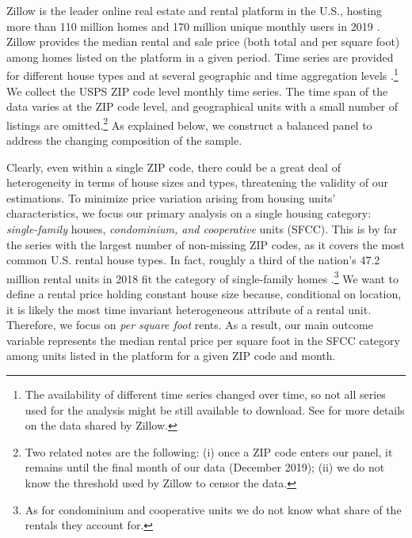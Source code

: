Zillow is the leader online real estate and rental platform in the U.S., hosting more 
than 110 million homes and 170 million unique monthly users in 2019 
\parencite{ZillowFacts}. Zillow provides the median rental and sale price (both 
total and per square foot) among homes listed on the platform in a given period. Time 
series are provided for different house types and at several geographic and time 
aggregation levels \parencite{ZillowData}.\footnote{The availability of different time 
	series changed over time, so not all series used for the analysis might be still 
	available to download. See \textcite{ZillowData} for more details on the data shared 
	by Zillow.} 
We collect the USPS ZIP code level monthly time series. The time span of the data 
varies at the ZIP code level, and geographical units with a small number of listings
are omitted.\footnote{Two related notes are the following: (i) once a ZIP code enters 
	our panel, it remains until the final month of our data (December 2019); (ii) we do not 
	know the threshold used by Zillow to censor the data.} 
As explained below, we construct a balanced panel to address the changing composition 
of the sample.

Clearly, even within a single ZIP code, there could be a great deal of heterogeneity in 
terms of house sizes and types, threatening the validity of our estimations.
To minimize price variation arising from housing units' characteristics, we focus 
our primary analysis on a single housing category: \textit{single-family} houses, 
\textit{condominium, and cooperative} units (SFCC). This is by far the series with the 
largest number of non-missing ZIP codes, as it covers the most common U.S. rental house 
types. In fact, roughly a third of the nation's 47.2 million rental units in 2018 fit the 
category of single-family homes \parencite{fernald2020americas}.\footnote{As for condominium 
	and cooperative units we do not know what share of the rentals they account for.} 
We want to define a rental price holding constant house size because, conditional on location,
it is likely the most time invariant heterogeneous attribute of a rental unit. Therefore, 
we focus on \textit{per square foot} rents. As a result, our main 
outcome variable represents the median rental price per square foot in the SFCC category 
among units listed in the platform for a given ZIP code and month. 

